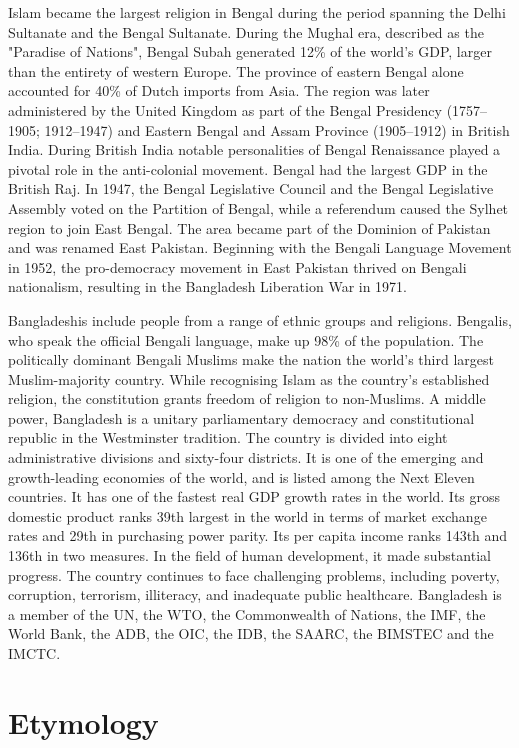 Islam became the largest religion in Bengal during the period spanning
the Delhi Sultanate and the Bengal Sultanate. During the Mughal era,
described as the "Paradise of Nations", Bengal Subah generated 12\% of
the world's GDP, larger than the entirety of western Europe. The
province of eastern Bengal alone accounted for 40\% of Dutch imports
from Asia. The region was later administered by the United Kingdom as
part of the Bengal Presidency (1757--1905; 1912--1947) and Eastern
Bengal and Assam Province (1905--1912) in British India. During British
India notable personalities of Bengal Renaissance played a pivotal role
in the anti-colonial movement. Bengal had the largest GDP in the British
Raj. In 1947, the Bengal Legislative Council and the Bengal Legislative
Assembly voted on the Partition of Bengal, while a referendum caused the
Sylhet region to join East Bengal. The area became part of the Dominion
of Pakistan and was renamed East Pakistan. Beginning with the Bengali
Language Movement in 1952, the pro-democracy movement in East Pakistan
thrived on Bengali nationalism, resulting in the Bangladesh Liberation
War in 1971.

Bangladeshis include people from a range of ethnic groups and religions.
Bengalis, who speak the official Bengali language, make up 98\% of the
population. The politically dominant Bengali Muslims make the nation the
world's third largest Muslim-majority country. While recognising Islam
as the country's established religion, the constitution grants freedom
of religion to non-Muslims. A middle power, Bangladesh is a unitary
parliamentary democracy and constitutional republic in the Westminster
tradition. The country is divided into eight administrative divisions
and sixty-four districts. It is one of the emerging and growth-leading
economies of the world, and is listed among the Next Eleven countries.
It has one of the fastest real GDP growth rates in the world. Its gross
domestic product ranks 39th largest in the world in terms of market
exchange rates and 29th in purchasing power parity. Its per capita
income ranks 143th and 136th in two measures. In the field of human
development, it made substantial progress. The country continues to face
challenging problems, including poverty, corruption, terrorism,
illiteracy, and inadequate public healthcare. Bangladesh is a member of
the UN, the WTO, the Commonwealth of Nations, the IMF, the World Bank,
the ADB, the OIC, the IDB, the SAARC, the BIMSTEC and the IMCTC.

\section{Etymology}\label{etymology}

